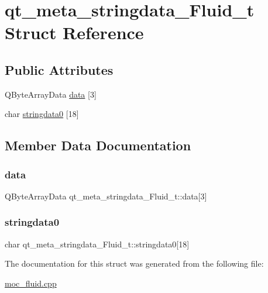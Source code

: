\hypertarget{structqt__meta__stringdata__Fluid__t}{}\section{qt\+\_\+meta\+\_\+stringdata\+\_\+\+Fluid\+\_\+t Struct Reference}
\label{structqt__meta__stringdata__Fluid__t}
\subsection*{Public Attributes}
\begin{DoxyCompactItemize}
\item 
Q\+Byte\+Array\+Data \mbox{\hyperlink{structqt__meta__stringdata__Fluid__t_ac2ba8ac3c69d1e836a3f11d97545aa52}{data}} \mbox{[}3\mbox{]}
\item 
char \mbox{\hyperlink{structqt__meta__stringdata__Fluid__t_ab08923603b2f305fc6d554d5041150db}{stringdata0}} \mbox{[}18\mbox{]}
\end{DoxyCompactItemize}


\subsection{Member Data Documentation}
\mbox{\label{structqt__meta__stringdata__Fluid__t_ac2ba8ac3c69d1e836a3f11d97545aa52}} 
\subsubsection{\texorpdfstring{data}{data}}
{\footnotesize\ttfamily Q\+Byte\+Array\+Data qt\+\_\+meta\+\_\+stringdata\+\_\+\+Fluid\+\_\+t\+::data\mbox{[}3\mbox{]}}

\mbox{\label{structqt__meta__stringdata__Fluid__t_ab08923603b2f305fc6d554d5041150db}} 
\subsubsection{\texorpdfstring{stringdata0}{stringdata0}}
{\footnotesize\ttfamily char qt\+\_\+meta\+\_\+stringdata\+\_\+\+Fluid\+\_\+t\+::stringdata0\mbox{[}18\mbox{]}}



The documentation for this struct was generated from the following file\+:\begin{DoxyCompactItemize}
\item 
\mbox{\hyperlink{moc__fluid_8cpp}{moc\+\_\+fluid.\+cpp}}\end{DoxyCompactItemize}
